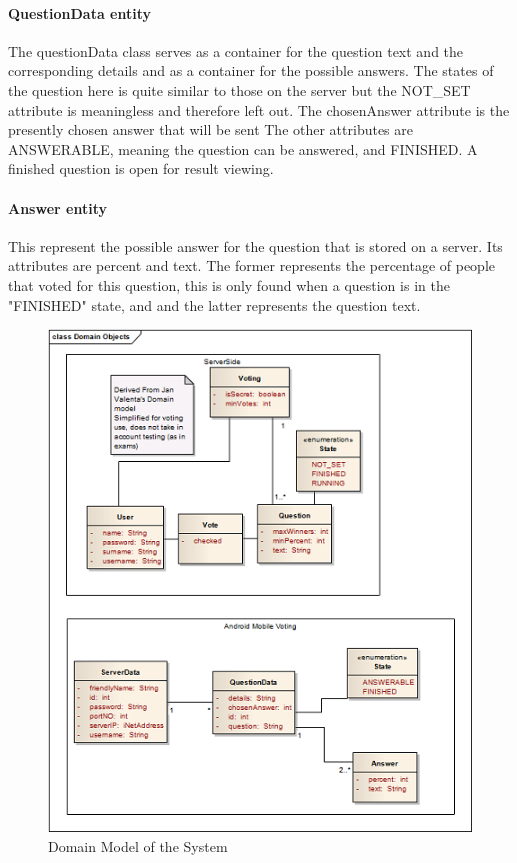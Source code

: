 \documentclass[11pt,twoside,a4paper]{book}
\begin{document}
\paragraph{QuestionData entity}
The questionData class serves as a container for the question text and the corresponding details and as a container for the possible answers. The states of the question here is quite similar to those on the server but the NOT\_SET attribute is meaningless and therefore left out. The chosenAnswer attribute is the presently chosen answer that will be sent The other attributes are ANSWERABLE, meaning the question can be answered, and FINISHED. A finished question is open for result viewing. 
\paragraph{Answer entity} 
This represent the possible answer for the question that is stored on a server. Its attributes are percent and text. The former represents the percentage of people that voted for this question, this is only found when a question is in the "FINISHED" state, and and the latter represents the question text.





\begin{figure}[h]
\begin{center}
\includegraphics[scale=1]{figures/DomainObjects.png} 
\caption{Domain Model of the System}
\label{fig:Domain Model}
\end{center}
\end{figure}
\end{document}
